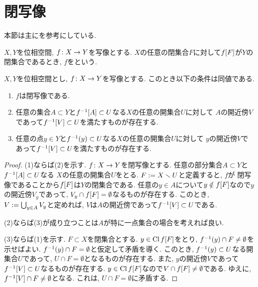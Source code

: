 \documentclass[uplatex, dvipdfmx, a4paper, 12pt, class=jsbook, crop=false]{standalone}
\begin{document}
\section{閉写像}
\label{sec:closed-maps}

\begin{source}
	本節は主に\cite{Engelking1989GT}を参考にしている.
\end{source}

\begin{definition}
	$ X, Y $を位相空間, $ f\colon X\to Y $を写像とする.
	$ X $の任意の閉集合$ F $に対して$ \mapset{f}{F} $が$ Y $の閉集合であるとき,
	$ f $をという.
\end{definition}

\begin{proposition}
	\label{c00001}
	$ X, Y $を位相空間とし, $ f\colon X\to Y $を写像とする.
	このとき以下の条件は同値である.
	\begin{enumerate}
		\item $ f $は閉写像である.
		\item 任意の集合$ A \subset Y $と$ \mapinvset{f}{A} \subset U $なる$ X $の任意の開集合$ U $に対して
		$ A $の開近傍$ V $であって$ \mapinvset{f}{V} \subset U $を満たすものが存在する.
		\item 任意の点$ y \in Y $と$ \mapinvpt{f}{y} \subset U $なる$ X $の任意の開集合$ U $に対して
		$ y $の開近傍$ V $であって$ \mapinvset{f}{V} \subset U $を満たすものが存在する.
	\end{enumerate}
\end{proposition}

\begin{proof}
	(1)ならば(2)を示す. $ f\colon X\to Y $を閉写像とする.
	任意の部分集合$ A \subset Y $と$ \mapinvset{f}{A} \subset U $なる
	$ X $の任意の開集合$ U $をとる. $ F \mathrel{:=} X \smallsetminus U $と定義すると, $ f $が
	閉写像であることから$ \mapset{f}{F} $は$ Y $の閉集合である.
	任意の$ y \in A $について$ y \notin \mapset{f}{F} $なので$ y $の開近傍$ V_y $であって,
	$ V_y \cap \mapset{f}{F} = \emptyset $なるものが存在する.
	このとき, $ V \mathrel{:=} \bigcup_{y \in A} V_y $と定めれば,
	$ V $は$ A $の開近傍であって$ \mapinvset{f}{V} \subset U $である.

	(2)ならば(3)が成り立つことは$ A $が特に一点集合の場合を考えれば良い.

	(3)ならば(1)を示す. $ F \subset  X $を閉集合とする.
	$ y \in \topcl \mapset{f}{F} $をとり, $ \mapinvpt{f}{y} \cap F \neq \emptyset $を示せばよい.
	$ \mapinvpt{f}{y} \cap F = \emptyset $と仮定して矛盾を導く.
	このとき, $ \mapinvpt{f}{y} \subset U $なる開集合$ U $であって, $ U \cap F = \emptyset $となるものが存在する.
	また, $ y $の開近傍$ V $であって$ \mapinvset{f}{V} \subset U $なるものが存在する.
	$ y \in \topcl \mapset{f}{F} $なので$ V \cap \mapset{f}{F} \neq \emptyset $である.
	ゆえに, $ \mapinvset{f}{V} \cap F \neq \emptyset $となる.
	これは, $ U \cap F = \emptyset $に矛盾する.
\end{proof}
\end{document}
